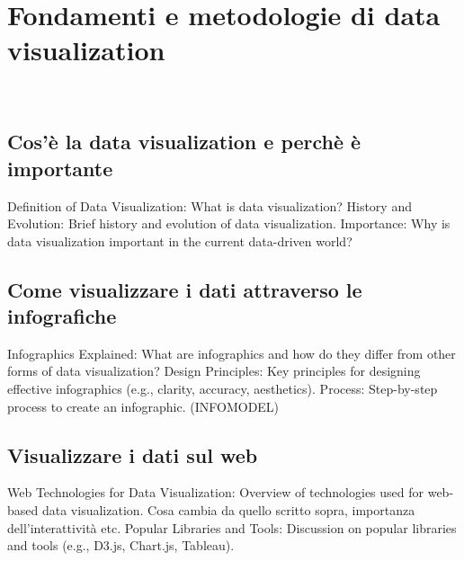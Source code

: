 \chapter{Fondamenti e metodologie di data visualization}
\label{cap:studio}
\\

\section{Cos'è la data visualization e perchè è importante}
Definition of Data Visualization: What is data visualization?
History and Evolution: Brief history and evolution of data visualization.
Importance: Why is data visualization important in the current data-driven world?

\section{Come visualizzare i dati attraverso le infografiche}
Infographics Explained: What are infographics and how do they differ from other forms of data visualization?
Design Principles: Key principles for designing effective infographics (e.g., clarity, accuracy, aesthetics).
Process: Step-by-step process to create an infographic. (INFOMODEL)

\section{Visualizzare i dati sul web}
Web Technologies for Data Visualization: Overview of technologies used for web-based data visualization.
Cosa cambia da quello scritto sopra, importanza dell'interattività etc.
Popular Libraries and Tools: Discussion on popular libraries and tools (e.g., D3.js, Chart.js, Tableau).
